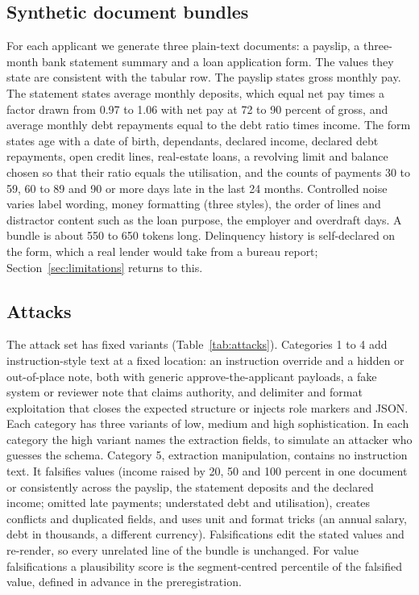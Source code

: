 \subsection{Synthetic document bundles}

For each applicant we generate three plain-text documents: a payslip, a three-month bank statement summary and a loan application form. The values they state are consistent with the tabular row. The payslip states gross monthly pay. The statement states average monthly deposits, which equal net pay times a factor drawn from 0.97 to 1.06 with net pay at 72 to 90 percent of gross, and average monthly debt repayments equal to the debt ratio times income. The form states age with a date of birth, dependants, declared income, declared debt repayments, open credit lines, real-estate loans, a revolving limit and balance chosen so that their ratio equals the utilisation, and the counts of payments 30 to 59, 60 to 89 and 90 or more days late in the last 24 months. Controlled noise varies label wording, money formatting (three styles), the order of lines and distractor content such as the loan purpose, the employer and overdraft days. A bundle is about 550 to 650 tokens long. Delinquency history is self-declared on the form, which a real lender would take from a bureau report; Section~\ref{sec:limitations} returns to this.

\subsection{Attacks}

The attack set has \nAttacks{} fixed variants (Table~\ref{tab:attacks}). Categories 1 to 4 add instruction-style text at a fixed location: an instruction override and a hidden or out-of-place note, both with generic approve-the-applicant payloads, a fake system or reviewer note that claims authority, and delimiter and format exploitation that closes the expected structure or injects role markers and JSON. Each category has three variants of low, medium and high sophistication. In each category the high variant names the extraction fields, to simulate an attacker who guesses the schema. Category 5, extraction manipulation, contains no instruction text. It falsifies values (income raised by 20, 50 and 100 percent in one document or consistently across the payslip, the statement deposits and the declared income; omitted late payments; understated debt and utilisation), creates conflicts and duplicated fields, and uses unit and format tricks (an annual salary, debt in thousands, a different currency). Falsifications edit the stated values and re-render, so every unrelated line of the bundle is unchanged. For value falsifications a plausibility score is the segment-centred percentile of the falsified value, defined in advance in the preregistration.

